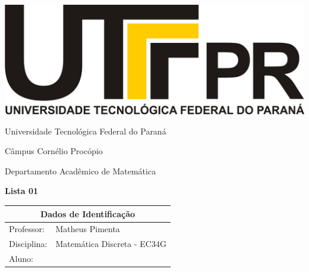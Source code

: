 \documentclass[oneside,a4paper,12pt]{article}
\newcommand{\universidade}{Universidade Tecnológica Federal do Paraná}
\newcommand{\centro}{Câmpus Cornélio Procópio}
\newcommand{\departamento}{Departamento Acadêmico de Matemática}
\newcommand{\curso}{Engenharia da Computação}
\newcommand{\professores}{Matheus Pimenta}
\newcommand{\disciplina}{Matemática Discreta - EC34G}
\begin{document}
	\pagestyle{empty}
	
	\begin{center}
		\includegraphics[width=\linewidth/8]{logo.jpg}%
	 	\vspace{2pt} 	
		
		\universidade
		\par
		\centro
		\par
		\departamento
		\par
		\par
		\vspace{12pt}
		\LARGE \textbf{Lista 01}
		
	\end{center}
	
	\vspace{12pt}
	
	\begin{tabular}{ |l|p{12cm}| }
		
		\hline
		\multicolumn{2}{|c|}{\textbf{Dados de Identificação}} \\
		\hline
		Professor:         &    \professores           \\
		\hline
		Disciplina:        &    \disciplina          \\
		\hline
		Aluno:             &                   \\
		\hline
		
	\end{tabular}
	\vspace{6pt}
	
	
	\begin{snugshade}
	\end{snugshade}
\end{document}
